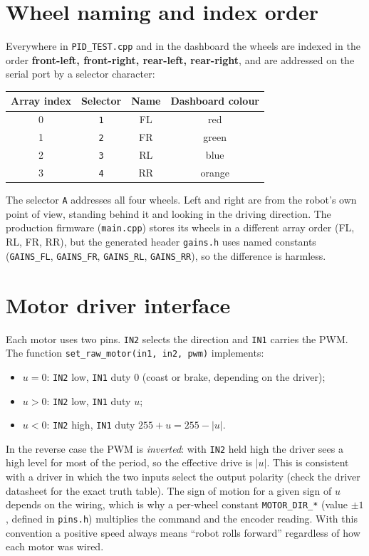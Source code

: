 \documentclass[11pt,a4paper]{report}
\newcommand{\code}[1]{\texttt{#1}}
\begin{document}
\section{Wheel naming and index order}
Everywhere in \code{PID\_TEST.cpp} and in the dashboard the wheels are indexed in the order \textbf{front-left, front-right, rear-left, rear-right}, and are addressed on the serial port by a selector character:
\begin{center}
\begin{tabular}{cccc}
\toprule
Array index & Selector & Name & Dashboard colour\\
\midrule
0 & \code{1} & FL & red\\
1 & \code{2} & FR & green\\
2 & \code{3} & RL & blue\\
3 & \code{4} & RR & orange\\
\bottomrule
\end{tabular}
\end{center}
The selector \code{A} addresses all four wheels. Left and right are from the robot's own point of view, standing behind it and looking in the driving direction. The production firmware (\code{main.cpp}) stores its wheels in a different array order (FL, RL, FR, RR), but the generated header \code{gains.h} uses named constants (\code{GAINS\_FL}, \code{GAINS\_FR}, \code{GAINS\_RL}, \code{GAINS\_RR}), so the difference is harmless.

\section{Motor driver interface}
Each motor uses two pins. \code{IN2} selects the direction and \code{IN1} carries the PWM. The function \code{set\_raw\_motor(in1, in2, pwm)} implements:
\begin{itemize}[noitemsep]
  \item $u = 0$: \code{IN2} low, \code{IN1} duty 0 (coast or brake, depending on the driver);
  \item $u > 0$: \code{IN2} low, \code{IN1} duty $u$;
  \item $u < 0$: \code{IN2} high, \code{IN1} duty $255 + u = 255 - |u|$.
\end{itemize}
In the reverse case the PWM is \emph{inverted}: with \code{IN2} held high the driver sees a high level for most of the period, so the effective drive is $|u|$. This is consistent with a driver in which the two inputs select the output polarity (check the driver datasheet for the exact truth table). The sign of motion for a given sign of $u$ depends on the wiring, which is why a per-wheel constant \code{MOTOR\_DIR\_*} (value $\pm1$, defined in \code{pins.h}) multiplies the command and the encoder reading. With this convention a positive speed always means ``robot rolls forward'' regardless of how each motor was wired.
\end{document}
